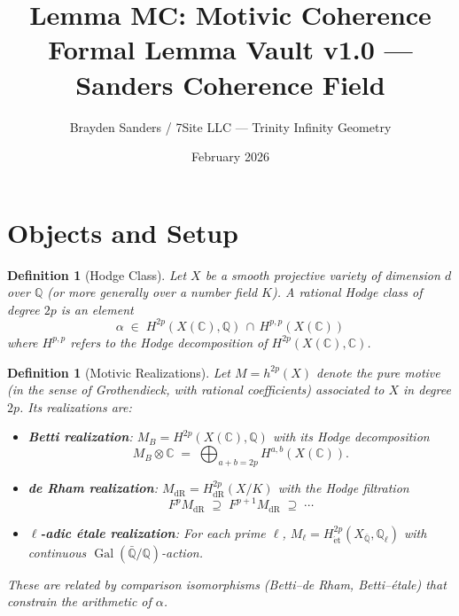 \documentclass[11pt]{article}
\title{%
  Lemma MC: Motivic Coherence\\[4pt]
  \large Formal Lemma Vault v1.0 --- Sanders Coherence Field}
\author{Brayden Sanders / 7Site LLC --- Trinity Infinity Geometry}
\date{February 2026}
\newtheorem{definition}[lemma]{Definition}
\theoremstyle{definition}
\DeclareMathOperator{\Gal}{Gal}
\begin{document}
\maketitle

\section{Objects and Setup}

\begin{definition}[Hodge Class]
\label{def:hodge-class}
Let $X$ be a smooth projective variety of dimension $d$ over $\mathbb{Q}$
(or more generally over a number field $K$).
A \emph{rational Hodge class} of degree $2p$ is an element
\[
  \alpha \;\in\; H^{2p}(X(\mathbb{C}), \mathbb{Q}) \,\cap\, H^{p,p}(X(\mathbb{C}))
\]
where $H^{p,p}$ refers to the Hodge decomposition of $H^{2p}(X(\mathbb{C}), \mathbb{C})$.
\end{definition}

\begin{definition}[Motivic Realizations]
\label{def:realizations}
Let $M = h^{2p}(X)$ denote the pure motive (in the sense of Grothendieck, with rational coefficients)
associated to $X$ in degree $2p$.  Its realizations are:
\begin{itemize}
  \item \textbf{Betti realization}: $M_B = H^{2p}(X(\mathbb{C}), \mathbb{Q})$ with its Hodge decomposition
    \[
      M_B \otimes \mathbb{C} \;=\; \bigoplus_{a+b=2p} H^{a,b}(X(\mathbb{C})).
    \]
  \item \textbf{de Rham realization}: $M_{\mathrm{dR}} = H^{2p}_{\mathrm{dR}}(X/K)$ with the Hodge filtration
    \[
      F^p M_{\mathrm{dR}} \;\supseteq\; F^{p+1} M_{\mathrm{dR}} \;\supseteq\; \cdots
    \]
  \item \textbf{$\ell$-adic \'etale realization}: For each prime $\ell$,
    $M_\ell = H^{2p}_{\mathrm{\acute{e}t}}(X_{\bar{\mathbb{Q}}}, \mathbb{Q}_\ell)$
    with continuous $\Gal(\bar{\mathbb{Q}}/\mathbb{Q})$-action.
\end{itemize}
These are related by comparison isomorphisms (Betti--de Rham, Betti--\'etale)
that constrain the arithmetic of $\alpha$.
\end{definition}
\end{document}
